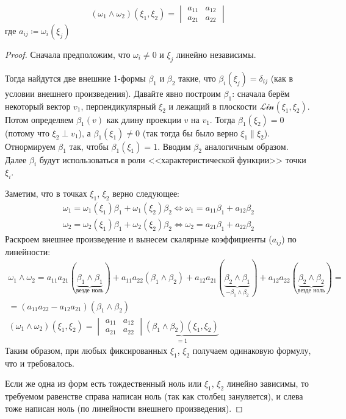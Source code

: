 \begin{theorem}
	\[ (\omega_1 \wedge \omega_2)(\xi_1, \xi_2) = \begin{vmatrix} a_{11} & a_{12} \\ a_{21} & a_{22} \end{vmatrix} \]
	где $a_{ij} \coloneq \omega_i(\xi_j)$
\end{theorem}
\begin{proof}
	Сначала предположим, что $\omega_i \neq 0$ и $\xi_j$ линейно независимы.

	Тогда найдутся две внешние 1-формы $\beta_1$ и $\beta_2$ такие, что $\beta_i(\xi_j) = \delta_{ij}$ (как в условии внешнего произведения).
	Давайте явно построим $\beta_1$: сначала берём некоторый вектор $v_1$, перпендикулярный $\xi_2$ и лежащий в плоскости $\mathcal{Lin}(\xi_1, \xi_2)$.
	Потом определяем $\beta_1(v)$ как длину проекции $v$ на $v_1$.
	Тогда $\beta_1(\xi_2)=0$ (потому что $\xi_2\perp v_1$), а $\beta_1(\xi_1)\neq 0$ (так тогда бы было верно $\xi_1 \parallel \xi_2$).
	Отнормируем $\beta_1$ так, чтобы $\beta_1(\xi_1)=1$.
	Вводим $\beta_2$ аналогичным образом.
	Далее $\beta_i$ будут использоваться в роли <<характеристической функции>> точки $\xi_i$.

	Заметим, что в точках $\xi_1$, $\xi_2$ верно следующее:
	\begin{gather*}
		\omega_1 = \omega_1(\xi_1) \beta_1 + \omega_1(\xi_2) \beta_2
		\iff
		\omega_1 = a_{11} \beta_1 + a_{12} \beta_2 \\
		\omega_2 = \omega_2(\xi_1) \beta_1 + \omega_2(\xi_2) \beta_2
		\iff
		\omega_2 = a_{21} \beta_1 + a_{22} \beta_2
	\end{gather*}
	Раскроем внешнее произведение и вынесем скалярные коэффициенты ($a_{ij}$) по линейности:
	\begin{gather*}
		\omega_1 \wedge \omega_2
		= a_{11} a_{21} (\underbrace{\beta_1 \wedge \beta_1}_{\text{везде ноль}})
		+ a_{11} a_{22} (\beta_1 \wedge \beta_2)
		+ a_{12} a_{21} (\underbrace{\beta_2 \wedge \beta_1}_{-\beta_1 \wedge \beta_2})
		+ a_{12} a_{22} (\underbrace{\beta_2 \wedge \beta_2}_{\text{везде ноль}}) = \\
		= (a_{11} a_{22} - a_{12} a_{21}) (\beta_1 \wedge \beta_2) \\
		(\omega_1 \wedge \omega_2) (\xi_1, \xi_2)
		= \begin{vmatrix} a_{11} & a_{12} \\ a_{21} & a_{22} \end{vmatrix} \underbrace{(\beta_1 \wedge \beta_2) (\xi_1, \xi_2)}_{=1}
	\end{gather*}
	Таким образом, при любых фиксированных $\xi_1$, $\xi_2$ получаем одинаковую формулу, что и требовалось.

	Если же одна из форм есть тождественный ноль или $\xi_1$, $\xi_2$ линейно зависимы, то требуемом равенстве справа написан ноль
	(так как столбец зануляется), и слева тоже написан ноль (по линейности внешнего произведения).
\end{proof}

